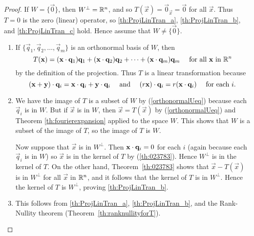 \documentclass{ximera}
\begin{document}
\begin{proof}
If $W = \{\vec{0}\}$, then $W^\perp = \mathbb{R}^n$, and so $T(\vec{x}) = \vec{0}_\vec{x} = \vec{0}$ for all $\vec{x}$. Thus $T = 0$ is the zero (linear) operator, so \ref{th:ProjLinTran_a}, \ref{th:ProjLinTran_b}, and \ref{th:ProjLinTran_c} hold. Hence assume that $W \neq \{\vec{0}\}$.

\begin{enumerate}
\item If $\{\vec{q}_{1}, \vec{q}_{2}, \dots, \vec{q}_{m}\}$ is an orthonormal basis of $W$, then
\begin{equation}\label{orthonormalUeq}
T(\mathbf{x}) = (\mathbf{x} \cdot \mathbf{q}_{1})\mathbf{q}_{1} + (\mathbf{x} \cdot \mathbf{q}_{2})\mathbf{q}_{2} + \dots + (\mathbf{x} \cdot \mathbf{q}_{m})\mathbf{q}_{m} \quad \mbox{ for all }\mathbf{x} \mbox{ in } \mathbb{R}^n
\end{equation}
by the definition of the projection. Thus $T$ is a linear transformation because
\begin{equation*}
(\mathbf{x} + \mathbf{y}) \cdot \mathbf{q}_{i} = \mathbf{x} \cdot \mathbf{q}_{i} + \mathbf{y} \cdot \mathbf{q}_{i} \quad \mbox{ and } \quad (r\mathbf{x}) \cdot \mathbf{q}_{i} = r(\mathbf{x} \cdot \mathbf{q}_{i}) \quad \mbox{ for each } i.
\end{equation*}

\item %
We have the image of $T$ is a subset of $W$ by (\ref{orthonormalUeq}) because each $\vec{q}_{i}$ is in $W$. But if $\vec{x}$ is in $W$, then $\vec{x} = T(\vec{x})$ by (\ref{orthonormalUeq}) and Theorem \ref{th:fourierexpansion} applied to the space $W$. This shows that $W$ is a subset of the image of $T$, so the image of $T$ is $W$.

Now suppose that $\vec{x}$ is in $W^\perp$. Then $\mathbf{x} \cdot \mathbf{q}_{i} = 0$ for each $i$ (again because each $\vec{q}_{i}$ is in $W$) so $\vec{x}$ is in the kernel of $T$ by (\ref{th:023783}). Hence $W^\perp$ is in the kernel of $T$. On the other hand, Theorem~\ref{th:023783} shows that $\vec{x} - T(\vec{x})$ is in $W^\perp$ for all $\vec{x}$ in $\mathbb{R}^n$, and it follows that the kernel of $T$ is in $W^\perp$. Hence the kernel of $T$ is $W^\perp$, proving \ref{th:ProjLinTran_b}.

\item This follows from \ref{th:ProjLinTran_a}, \ref{th:ProjLinTran_b}, and the Rank-Nullity theorem (Theorem~\ref{th:ranknullityforT}).
\end{enumerate}
\end{proof}
\end{document}

